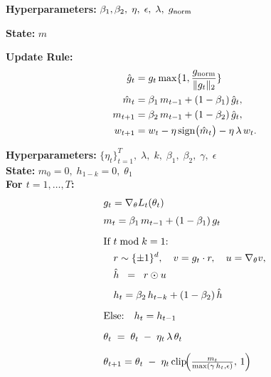 \begin{algorithm}[H]
  \caption{Lion}
  \label{alg:lion}
  \begin{tcolorbox}
  \textbf{Hyperparameters:} $\beta_1, \beta_2,\;\eta,\;\epsilon,\;\lambda,\;g_{\mathrm{norm}}$

  \textbf{State:} $m$

  \textbf{Update Rule:}
  \begin{align*}
  \hat g_t &= g_t \max\{1, \frac{g_{\mathrm{norm}}}{\|g_t\|_2}\} \\
  \hat m_t &= \beta_1 \,m_{t-1} + (1-\beta_1)\,\hat g_t,\\
  m_{t + 1} &= \beta_2 \,m_{t - 1} + (1-\beta_2)\,\hat g_t,\\
  w_{t+1} &= w_t - \eta\,\mathrm{sign}\bigl(\hat m_t\bigr) - \eta\,\lambda\,w_t.
  \end{align*}
  \end{tcolorbox}
\end{algorithm}


\begin{algorithm}[H]
  \caption{Sophia-H}
  \label{alg:sophia}
  \begin{tcolorbox}
    \textbf{Hyperparameters:}
      $\{\eta_t\}_{t=1}^T,\; \lambda,\; k,\; \beta_1,\;\beta_2,\;\gamma,\;\epsilon$ \\[0.5ex]
    \textbf{State:} $m_0 = 0,\; h_{1-k} = 0,\; \theta_1$ \\[0.5ex]
    \textbf{For $t=1,\dots,T$:}
    \begin{align*}
      & g_t = \nabla_{\theta}L_t(\theta_t) \\[0.3em]
      & m_t = \beta_1\,m_{t-1} + (1-\beta_1)\,g_t \\[0.6em]
      &\text{If }t \bmod k = 1\text{:}\\
      &\quad r\sim\{\pm1\}^d,\quad 
            v = g_t \cdot r,\quad
            u = \nabla_{\theta}v,\\
      &\quad \hat h \;\;=\;\; r \odot u \\[0.3em]
      &\quad
            h_t = \beta_2\,h_{t-k} + (1-\beta_2)\,\hat h \\[0.6em]
      &\text{Else:}\quad h_t = h_{t-1} \\[0.6em]
      &\theta_t \;=\; \theta_t \;-\; \eta_t\,\lambda\,\theta_t \\[0.6em]
      &\theta_{t+1} = \theta_t
           \;-\; \eta_t\,\mathrm{clip}\!\Bigl(\tfrac{m_t}{\max(\gamma\,h_t,\epsilon)},\,1\Bigr)
    \end{align*}
  \end{tcolorbox}
\end{algorithm}


